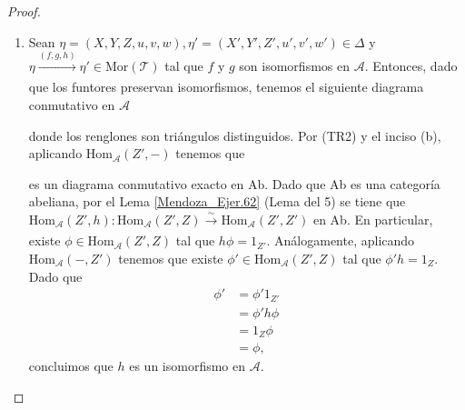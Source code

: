 \documentclass[tesis]{subfiles}
\begin{document}
\begin{proof}
\begin{enumerate}[label=(\alph*)]
\item Sean $\eta=(X,Y,Z,u,v,w), \eta'=(X',Y',Z',u',v',w')\in\Delta$ y $\eta\xrightarrow[]{(f,g,h)}\eta'\in\text{Mor}(\mathscr{T})$ tal que $f$ y $g$ son isomorfismos en $\mathscr{A}$. Entonces, dado que los funtores preservan isomorfismos, tenemos el siguiente diagrama conmutativo en $\mathscr{A}$
    \begin{center}
    \end{center}
    donde los renglones son triángulos distinguidos. Por (TR2) y el inciso (b), aplicando $\text{Hom}_\mathscr{A}(Z',-)$ tenemos que
    \begin{center}
    \end{center}
    es un diagrama conmutativo exacto en Ab. Dado que Ab es una categoría abeliana, por el Lema \ref{Mendoza_Ejer.62} (Lema del 5) se tiene que $\text{Hom}_\mathscr{A}(Z',h):\text{Hom}_\mathscr{A}(Z',Z)\xrightarrow[]{\sim}\text{Hom}_\mathscr{A}(Z',Z')$ en Ab. En particular, existe $\phi\in\text{Hom}_\mathscr{A}(Z',Z)$ tal que $h\phi=1_{Z'}$. Análogamente, aplicando $\text{Hom}_\mathscr{A}(-,Z')$ tenemos que existe $\phi'\in\text{Hom}_\mathscr{A}(Z',Z)$ tal que $\phi'h=1_Z$. Dado que
    \begin{align*}
        \phi' &= \phi'1_{Z'} \\
              &= \phi'h\phi \\
              &= 1_Z\phi \\
              &= \phi,
    \end{align*}
    concluimos que $h$ es un isomorfismo en $\mathscr{A}$.
    \end{enumerate}
\end{proof}
\end{document}
